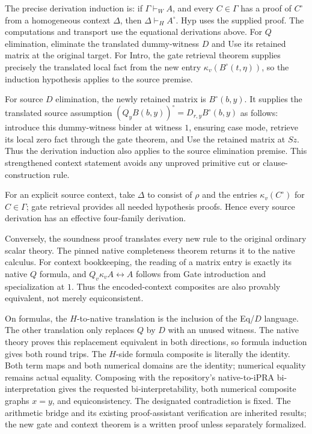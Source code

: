 The precise derivation induction is: if $\Gamma\vdash_W A$, and every
$C\in\Gamma$ has a proof of $C^\circ$ from a homogeneous context
$\Delta$, then $\Delta\vdash_H A^\circ$.  Hyp uses the supplied proof.
The computations and transport use the equational derivations above.
For $Q$ elimination, eliminate the translated dummy-witness $D$ and Use
its retained matrix at the original target.  For Intro, the gate
retrieval theorem supplies precisely the translated local fact from the
new entry $\kappa_v(B^\circ(t,\eta))$, so the induction hypothesis
applies to the source premise.

For source $D$ elimination, the newly retained matrix is
$B^\circ(b,y)$.  It supplies the translated source assumption
$(Q_yB(b,y))^\circ=D_{r,y}B^\circ(b,y)$ as follows: introduce this
dummy-witness binder at witness $1$, ensuring case mode, retrieve its
local zero fact through the gate theorem, and Use the retained matrix at
$Sz$.  Thus the derivation induction also applies to the source
elimination premise.  This strengthened context statement avoids any
unproved primitive cut or clause-construction rule.

For an explicit source context, take $\Delta$ to consist of $\rho$ and
the entries $\kappa_v(C^\circ)$ for $C\in\Gamma$; gate retrieval
provides all needed hypothesis proofs.  Hence every source derivation
has an effective four-family derivation.

Conversely, the soundness proof translates every new rule to the original
ordinary scalar theory.  The pinned native completeness theorem returns
it to the native calculus.  For context bookkeeping, the reading of a
matrix entry is exactly its native $Q$ formula, and
$Q_v\kappa_vA\leftrightarrow A$ follows from Gate introduction and
specialization at $1$.  Thus the encoded-context composites are also
provably equivalent, not merely equiconsistent.

On formulas, the $H$-to-native translation is the inclusion of the
Eq/$D$ language.  The other translation only replaces $Q$ by $D$ with
an unused witness.  The native theory proves this replacement
equivalent in both directions, so formula induction gives both
round trips.  The $H$-side formula composite is literally the identity.
Both term maps and both numerical domains are the identity; numerical
equality remains actual equality.  Composing with the repository's
native-to-iPRA bi-interpretation gives the requested bi-interpretability,
both numerical composite graphs $x=y$, and equiconsistency.  The
designated contradiction is fixed.  The arithmetic bridge and its
existing proof-assistant verification are inherited results; the new
gate and context theorem is a written proof unless separately formalized.

